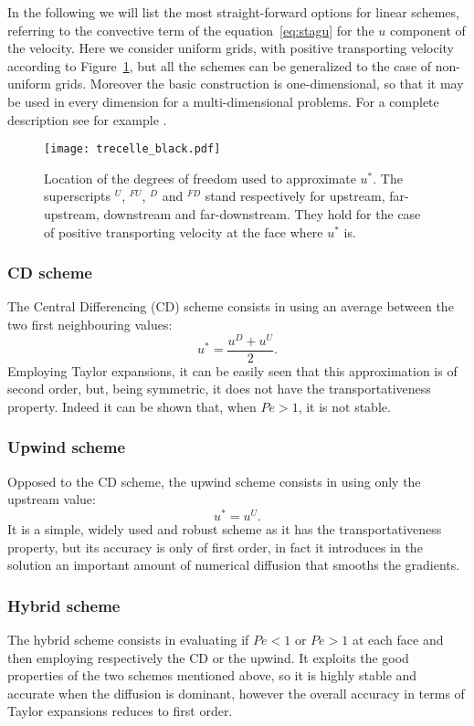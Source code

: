 In the following we will list the most straight-forward options for linear schemes, 
referring to the 
convective term of the equation~\eqref{eq:stagu} for the $u$ component of the 
velocity. Here we consider uniform grids, with positive 
transporting velocity according to 
Figure~\ref{fig:superscripts}, but all the schemes can be generalized to the 
case of non-uniform grids. Moreover the basic construction is one-dimensional, 
so that it may be used in every dimension for a multi-dimensional problems. For 
a complete description see for example \cite{main:vermal}.
\begin{figure}
	\centering
	\texttt{[image: trecelle\_black.pdf]}
	\caption[Location of the degrees of freedom used to approximate 
	$u^*$]{Location of the degrees of freedom used to approximate $u^*$. The 
	superscripts $^U$, $^{FU}$, $^D$ and $^{FD}$ stand respectively for 
	upstream, far-upstream, downstream and far-downstream. They hold for the 
	case of positive transporting velocity at the face where $u^*$ is.}
	\label{fig:superscripts}
\end{figure}
\subsubsection{CD scheme}
The Central Differencing (CD) scheme consists in using an average between the 
two first neighbouring values:
\begin{equation} \label{eq:cd}
	u^* = \frac{u^D + u^U}{2}.
\end{equation}
Employing Taylor expansions, it can be easily seen that this approximation is 
of second order, but, being symmetric, it does not have the transportativeness 
property. Indeed it can be shown that, when $Pe > 1$, it is not stable.
%
\subsubsection{Upwind scheme}
Opposed to the CD scheme, the upwind scheme consists in using only the 
upstream value:
\begin{equation} \label{eq:upwind}
	u^* = u^U.
\end{equation}
It is a simple, widely used and robust scheme as it has the transportativeness 
property, but its accuracy is only of first order, in fact it introduces in the 
solution an important amount of numerical diffusion that smooths the gradients. 
%
\subsubsection{Hybrid scheme}
The hybrid scheme \cite{diff:hybrid} consists in evaluating if $Pe<1$ or 
$Pe>1$ at each face and then employing respectively the CD or the upwind. It 
exploits the good properties of the two schemes mentioned above, so it is 
highly stable and accurate when the diffusion is dominant, however the overall 
accuracy in terms of Taylor expansions reduces to first order.
%
